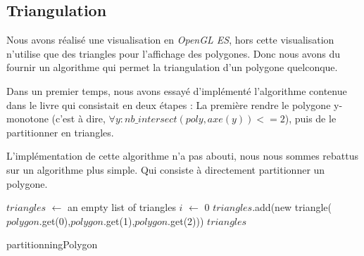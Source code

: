 \subsection{Triangulation}
Nous avons réalisé une visualisation en \emph{OpenGL ES}, hors cette visualisation n'utilise que des triangles pour l'affichage des polygones. Donc nous avons du fournir un algorithme qui permet la triangulation d'un polygone quelconque.

Dans un premier temps, nous avons essayé d'implémenté l'algorithme contenue dans le livre \cite[p.~45]{compute} qui consistait en deux étapes : La première rendre le polygone y-monotone (c'est à dire, $\forall y : nb\_intersect(poly,axe(y))<=2$), puis de le partitionner en triangles.

L'implémentation de cette algorithme n'a pas abouti, nous nous sommes rebattus sur un algorithme plus simple. Qui consiste à directement partitionner un polygone.\\

\begin{algorithm}[H]
$triangles$ $\gets$ an empty list of triangles\;
$i$ $\gets$ 0\;
$triangles$.add(new triangle($polygon$.get(0),$polygon$.get(1),$polygon$.get(2)))\;
\Return $triangles$\;
\caption{partitionningPolygon\label{triangulation}}
\end{algorithm}